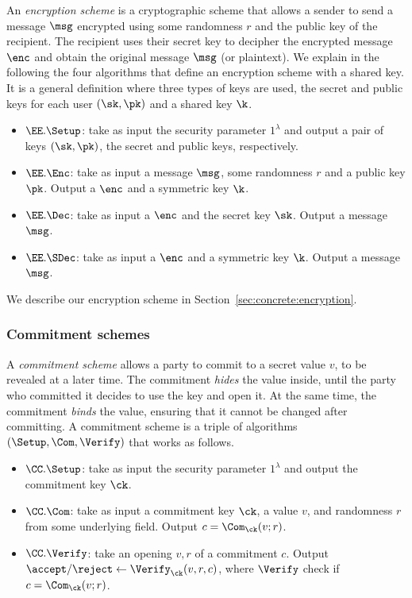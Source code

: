 An \emph{encryption scheme} is a cryptographic scheme that allows a sender to send a message $\msg$  encrypted using some randomness $r$ and the public key of the recipient. The recipient uses their secret key to decipher the encrypted message $\enc$ and obtain the original message $\msg$ (or plaintext). We explain in the following the four algorithms that define an encryption scheme with a shared key. It is a general definition where three types of keys are used, the secret and public keys for each user $(\sk, \pk)$ and a shared key $\k$.
\begin{itemize}
	\item $\EE.\Setup$: take as input the security parameter $1^{\lambda}$ and output a pair of keys $(\sk, \pk)$, the secret and public keys, respectively.
	\item $\EE.{\Enc}$: take as input a message $\msg$, some randomness $r$ and a public key $\pk$. Output a $\enc$ and a symmetric key $\k$.
	\item $\EE.{\Dec}$: take as input a $\enc$ and the secret key $\sk$. Output a message $\msg$.
	\item $\EE.{\SDec}$: take as input a $\enc$ and a symmetric key $\k$. Output a message $\msg$.
\end{itemize}
We describe our encryption scheme in Section~\ref{sec:concrete:encryption}.

\subsubsection{Commitment schemes}

A \emph{commitment scheme} allows a party to commit to a secret value $v$, to be revealed at a later time. The commitment \emph{hides} the value inside, until the party who committed it decides to use the key and open it. At the same time, the commitment \emph{binds} the value, ensuring that it cannot be changed after committing. A commitment scheme is a triple of algorithms $(\Setup, \Com, \Verify)$ that works as follows.
\begin{itemize}
	\item $\CC.\Setup$: take as input the security parameter $1^{\lambda}$ and output the commitment key $\ck$.
	\item $\CC.{\Com}$: take as input a commitment key $\ck$, a value $v$, and randomness $r$ from some underlying field. Output $c = \Com_{\ck}(v;r)$.
	\item $\CC.\Verify$: take an opening $v,r$ of a commitment $c$. Output $\accept/\reject \gets \Verify_{\ck}(v,r,c)$, where $\Verify$ check if $c = \Com_{\ck}(v;r)$.
\end{itemize}

